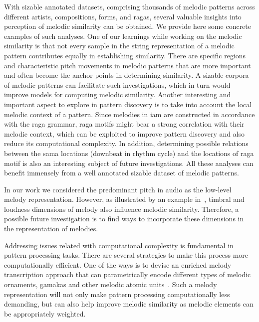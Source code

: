 With sizable annotated datasets, comprising thousands of melodic patterns across different artists, compositions, forms, and \glspl{raga}, several valuable insights into perception of melodic similarity can be obtained. We provide here some concrete examples of such analyses. One of our learnings while working on the melodic similarity is that not every sample in the string representation of a melodic pattern contributes equally in establishing similarity. There are specific regions and characteristic pitch movements in melodic patterns that are more important and often become the anchor points in determining similarity. A sizable corpora of melodic patterns can facilitate such investigations, which in turn would improve models for computing melodic similarity. Another interesting and important aspect to explore in pattern discovery is to take into account the local melodic context of a pattern. Since melodies in \gls{iam} are constructed in accordance with the \gls{raga} grammar, \gls{raga} motifs might bear a strong correlation with their melodic context, which can be exploited to improve pattern discovery and also reduce its computational complexity. In addition, determining possible relations between the \gls{sama} locations (downbeat in rhythm cycle) and the locations of \gls{raga} motif is also an interesting subject of future investigations. All these analyses can benefit immensely from a well annotated sizable dataset of melodic patterns.

In our work we considered the predominant pitch in audio as the low-level melody representation. However, as illustrated by an example in~, timbral and loudness dimensions of melody also influence melodic similarity. Therefore, a possible future investigation is to find ways to incorporate these dimensions in the representation of melodies.

Addressing issues related with computational complexity is fundamental in pattern processing tasks. There are several strategies to make this process more computationally efficient. One of the ways is to devise an enriched melody transcription approach that can parametrically encode different types of melodic ornaments, \glspl{gamaka} and other melodic atomic units~\cite{widdess1994involving,rao1999raga}. Such a melody representation will not only make pattern processing computationally less demanding, but can also help improve melodic similarity as melodic elements can be appropriately weighted.

